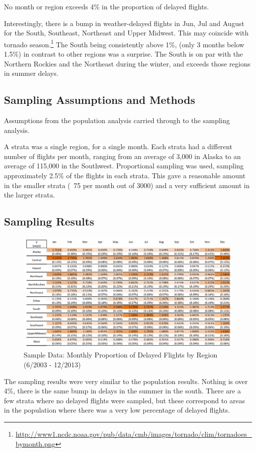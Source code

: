 \documentclass{article}
\begin{document}
\begin{multicols}{2}
No month or region exceeds 4\% in the proportion of delayed flights.

Interestingly, there is a bump in weather-delayed flights in Jun, Jul and August for the South, Southeast, Northeast and Upper Midwest. This may coincide with tornado season.\footnote{\url{http://www1.ncdc.noaa.gov/pub/data/cmb/images/tornado/clim/tornadoes_bymonth.png}} The South being consistently above 1\%, (only 3 months below 1.5\%) in contrast to other regions was a surprise. The South is on par with the Northern Rockies and the Northeast during the winter, and exceeds those regions in summer delays.


\subsection{Sampling Assumptions and Methods}
Assumptions from the population analysis carried through to the sampling analysis.

A strata was a single region, for a single month. Each strata had a different number of flights per month, ranging from an average of 3,000 in Alaska to an average of 115,000 in the Southwest. Proportional sampling was used, sampling approximately 2.5\% of the flights in each strata. This gave a reasonable amount in the smaller strata (~75 per month out of 3000) and a very sufficient amount in the larger strata. 

\subsection{Sampling Results}
\begin{figure}
\centering
\caption{Sample Data: Monthly Proportion of Delayed Flights by Region (6/2003 - 12/2013)}
\includegraphics[width=\textwidth]{../Images/SampSumm_USE.pdf}
\end{figure}
The sampling results were very similar to the population results. Nothing is over 4\%, there is the same bump in delays in the summer in the south. There are a few strata where no delayed flights were sampled, but these correspond to areas in the population where there was a very low percentage of delayed flights.


\end{multicols}
\end{document}
